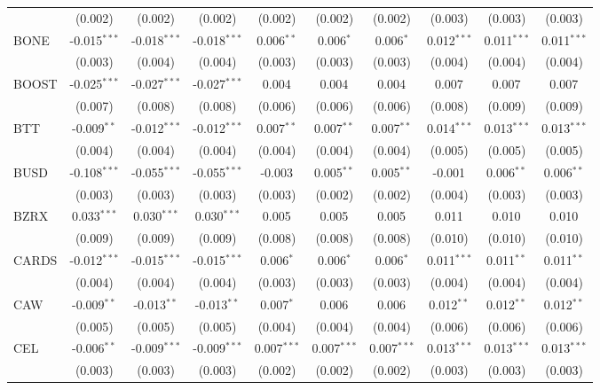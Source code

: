 \begin{table}[!htbp]
\begin{tabular}{@{\extracolsep{5pt}}lccccccccc}
  & (0.002) & (0.002) & (0.002) & (0.002) & (0.002) & (0.002) & (0.003) & (0.003) & (0.003) \\
 BONE & -0.015$^{***}$ & -0.018$^{***}$ & -0.018$^{***}$ & 0.006$^{**}$ & 0.006$^{*}$ & 0.006$^{*}$ & 0.012$^{***}$ & 0.011$^{***}$ & 0.011$^{***}$ \\
  & (0.003) & (0.004) & (0.004) & (0.003) & (0.003) & (0.003) & (0.004) & (0.004) & (0.004) \\
 BOOST & -0.025$^{***}$ & -0.027$^{***}$ & -0.027$^{***}$ & 0.004$^{}$ & 0.004$^{}$ & 0.004$^{}$ & 0.007$^{}$ & 0.007$^{}$ & 0.007$^{}$ \\
  & (0.007) & (0.008) & (0.008) & (0.006) & (0.006) & (0.006) & (0.008) & (0.009) & (0.009) \\
 BTT & -0.009$^{**}$ & -0.012$^{***}$ & -0.012$^{***}$ & 0.007$^{**}$ & 0.007$^{**}$ & 0.007$^{**}$ & 0.014$^{***}$ & 0.013$^{***}$ & 0.013$^{***}$ \\
  & (0.004) & (0.004) & (0.004) & (0.004) & (0.004) & (0.004) & (0.005) & (0.005) & (0.005) \\
 BUSD & -0.108$^{***}$ & -0.055$^{***}$ & -0.055$^{***}$ & -0.003$^{}$ & 0.005$^{**}$ & 0.005$^{**}$ & -0.001$^{}$ & 0.006$^{**}$ & 0.006$^{**}$ \\
  & (0.003) & (0.003) & (0.003) & (0.003) & (0.002) & (0.002) & (0.004) & (0.003) & (0.003) \\
 BZRX & 0.033$^{***}$ & 0.030$^{***}$ & 0.030$^{***}$ & 0.005$^{}$ & 0.005$^{}$ & 0.005$^{}$ & 0.011$^{}$ & 0.010$^{}$ & 0.010$^{}$ \\
  & (0.009) & (0.009) & (0.009) & (0.008) & (0.008) & (0.008) & (0.010) & (0.010) & (0.010) \\
 CARDS & -0.012$^{***}$ & -0.015$^{***}$ & -0.015$^{***}$ & 0.006$^{*}$ & 0.006$^{*}$ & 0.006$^{*}$ & 0.011$^{***}$ & 0.011$^{**}$ & 0.011$^{**}$ \\
  & (0.004) & (0.004) & (0.004) & (0.003) & (0.003) & (0.003) & (0.004) & (0.004) & (0.004) \\
 CAW & -0.009$^{**}$ & -0.013$^{**}$ & -0.013$^{**}$ & 0.007$^{*}$ & 0.006$^{}$ & 0.006$^{}$ & 0.012$^{**}$ & 0.012$^{**}$ & 0.012$^{**}$ \\
  & (0.005) & (0.005) & (0.005) & (0.004) & (0.004) & (0.004) & (0.006) & (0.006) & (0.006) \\
 CEL & -0.006$^{**}$ & -0.009$^{***}$ & -0.009$^{***}$ & 0.007$^{***}$ & 0.007$^{***}$ & 0.007$^{***}$ & 0.013$^{***}$ & 0.013$^{***}$ & 0.013$^{***}$ \\
  & (0.003) & (0.003) & (0.003) & (0.002) & (0.002) & (0.002) & (0.003) & (0.003) & (0.003) \\

\end{tabular}
\end{table}
